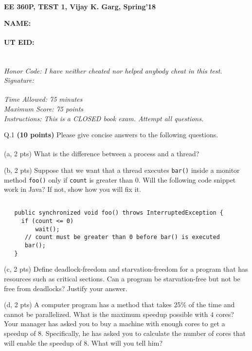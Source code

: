 \documentclass[10pt]{article}
\begin{document}

\vspace{0.5in}
\begin{center}
{\large \bf EE 360P, TEST 1, Vijay K. Garg, Spring'18}
\end{center}
\vspace{0.5in}
{\Large \bf
NAME:\\
\\
UT EID:\\
\\
\\
}
{\em Honor Code: I have neither cheated nor helped anybody cheat in this test. \\
Signature:}\\
\\
{\em
Time Allowed: 75 minutes\\
Maximum Score: 75 points\\
Instructions: This is a CLOSED book exam.
Attempt all questions.
}


\pagebreak

\noindent
Q.1 {\bf (10 points)}
Please give concise answers to the following questions.\\
\\

(a, 2 pts) What is the difference between a process and a thread?


\vspace{2.3in}

(b, 2 pts) Suppose that we want that a thread executes {\tt bar()} inside a monitor
method {\tt foo()} only if {\tt count} is greater than $0$.
Will the following code snippet work in Java? 
If not, show how you will fix it.
\begin{verbatim}

   public synchronized void foo() throws InterruptedException {
     if (count <= 0)
         wait();
      // count must be greater than 0 before bar() is executed
      bar();
   }
\end{verbatim}

\vspace{2.2in}

\noindent
(c, 2 pts)
Define deadlock-freedom and starvation-freedom for a program that has resources such as critical sections.
Can a program be starvation-free but not be free from deadlocks? Justify your answer.

\pagebreak

(d, 2 pts) 
A computer program has a method that takes 25\% of the time and cannot be parallelized.
What is the maximum speedup possible with $4$ cores? 
Your manager has asked you to buy a machine with enough cores to get a speedup of $8$.
Specifically, he has asked you to calculate the number of cores that will enable the speedup of $8$.
What will you tell him?
 
\end{document}
